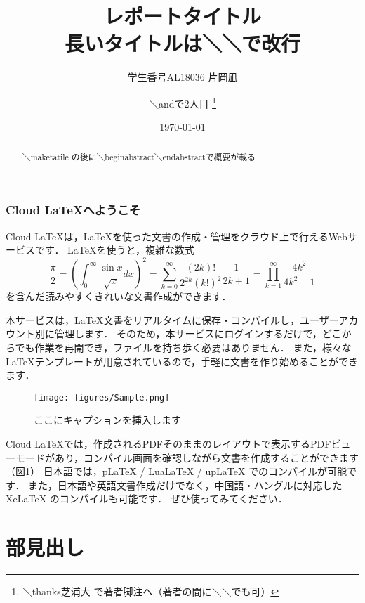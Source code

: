 \documentclass[a4paper,12pt,papersize,twocolumn,titlepage]{jsarticle}
\title{レポートタイトル　\\ 長いタイトルは＼＼で改行}
\author{学生番号AL18036 片岡凪 \and ＼andで2人目 \thanks{＼thanks芝浦大 で著者脚注へ（著者の間に＼＼でも可）}}
\date{\today}
\begin{document}
\maketitle 

\setcounter{tocdepth}{2}
\tableofcontents

\begin{abstract}
＼maketatile の後に＼begin{abstract}＼end{abstract}で概要が載る
\end{abstract}


\section{Cloud LaTeXへようこそ}

Cloud LaTeXは，\LaTeX を使った文書の作成・管理をクラウド上で行えるWebサービスです．
\LaTeX を使うと，複雑な数式
\begin{equation}
  \frac{\pi}{2} =
  \left( \int_{0}^{\infty} \frac{\sin x}{\sqrt{x}} dx \right)^2 =
  \sum_{k=0}^{\infty} \frac{(2k)!}{2^{2k}(k!)^2} \frac{1}{2k+1} =
  \prod_{k=1}^{\infty} \frac{4k^2}{4k^2 - 1}
\end{equation}
を含んだ読みやすくきれいな文書作成ができます．

\newpage

本サービスは，\LaTeX 文書をリアルタイムに保存・コンパイルし，ユーザーアカウント別に管理します．
そのため，本サービスにログインするだけで，どこからでも作業を再開でき，ファイルを持ち歩く必要はありません．
また，様々な \LaTeX テンプレートが用意されているので，手軽に文書を作り始めることができます．

\begin{figure}
 \centering
   \texttt{[image: figures/Sample.png]}
 \caption{ここにキャプションを挿入します}
 \label{fig:model}
\end{figure}

\noindent
Cloud LaTeXでは，作成されるPDFそのままのレイアウトで表示するPDFビューモードがあり，コンパイル画面を確認しながら文書を作成することができます（図\ref{fig:model}）
日本語では，pLaTeX / LuaLaTeX / upLaTeX でのコンパイルが可能です．
また，日本語や英語文書作成だけでなく，中国語・ハングルに対応した XeLaTeX のコンパイルも可能です．
ぜひ使ってみてください．

\part{部見出し}
\end{document}
